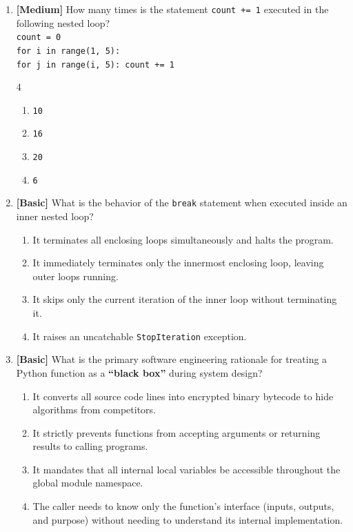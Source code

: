 \documentclass[11pt,a4paper]{article}
\begin{document}
\begin{enumerate}[label=\textbf{Q\arabic*.},leftmargin=1.8em,itemsep=0.8pt,topsep=0.3pt,resume]
\item \textbf{[Medium]} How many times is the statement \texttt{count += 1} executed in the following nested loop?\\
\texttt{count = 0}\\
\texttt{for i in range(1, 5):}\\
\texttt{\phantom{XX}for j in range(i, 5): count += 1}
\begin{multicols}{4}
\begin{enumerate}[label=\Alph*.]
  \item \texttt{10}
  \item \texttt{16}
  \item \texttt{20}
  \item \texttt{6}
\end{enumerate}
\end{multicols}

\item \textbf{[Basic]} What is the behavior of the \texttt{break} statement when executed inside an inner nested loop?
\begin{enumerate}[label=\Alph*.,leftmargin=1.8em]
  \item It terminates all enclosing loops simultaneously and halts the program.
  \item It immediately terminates only the innermost enclosing loop, leaving outer loops running.
  \item It skips only the current iteration of the inner loop without terminating it.
  \item It raises an uncatchable \texttt{StopIteration} exception.
\end{enumerate}

\item \textbf{[Basic]} What is the primary software engineering rationale for treating a Python function as a \textbf{``black box''} during system design?
\begin{enumerate}[label=\Alph*.,leftmargin=1.8em]
  \item It converts all source code lines into encrypted binary bytecode to hide algorithms from competitors.
  \item It strictly prevents functions from accepting arguments or returning results to calling programs.
  \item It mandates that all internal local variables be accessible throughout the global module namespace.
  \item The caller needs to know only the function's interface (inputs, outputs, and purpose) without needing to understand its internal implementation.
\end{enumerate}


\end{enumerate}
\end{document}
